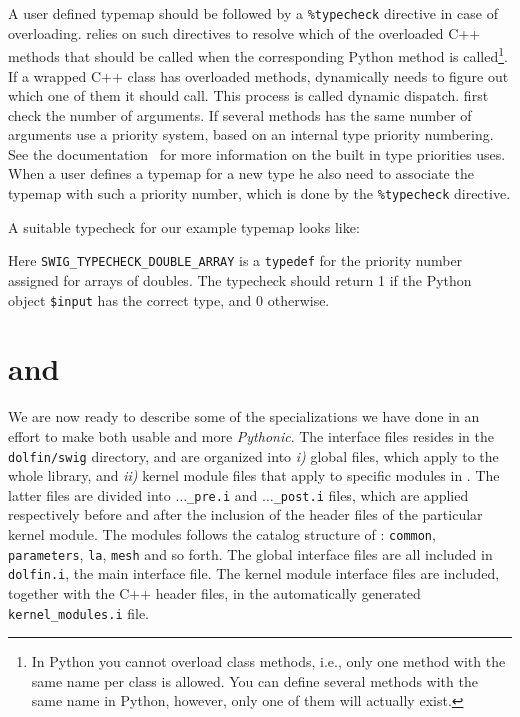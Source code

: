 A user defined typemap should be followed by a \texttt{\%typecheck} directive
in case of overloading. \swig relies on such directives to resolve which of the overloaded C++ methods that should be
called when the corresponding Python method is called\footnote{In Python you cannot overload class methods, i.e., only one method with the same name per class is allowed. You can define several methods with the same name in Python, however, only one of them will actually exist.}. If a wrapped C++ class has overloaded methods, \swig dynamically needs to figure out which one of them it should call. This process is called dynamic dispatch. \swig first check the number of arguments. If several methods has the same number of arguments \swig use a priority system, based on an internal type priority numbering. See the \swig documentation~\cite{www:swig} for more information on the built in type priorities \swig uses. When a user defines a typemap for a new type he also need to associate the typemap with such a priority number, which is done by the \texttt{\%typecheck} directive.\par
A suitable typecheck for our example typemap looks like:
Here \texttt{SWIG\_TYPECHECK\_DOUBLE\_ARRAY} is a \texttt{typedef} for the priority number assigned for arrays of doubles. The typecheck should return 1 if the Python object \texttt{\$input} has the correct type, and 0 otherwise.\par

\section{\swig and \pydolfin}
We are now ready to describe some of the specializations we have done in an effort to make \pydolfin both usable and more \textit{Pythonic}. The interface files resides in the \texttt{dolfin/swig} directory, and are organized into \textit{i)} global files, which apply to the whole \dolfin library, and \textit{ii)} kernel module files that apply to specific modules in \dolfin. The latter files are divided into \texttt{$\ldots$\_pre.i} and \texttt{$\ldots$\_post.i} files, which are applied respectively before and after the inclusion of the header files of the particular kernel module. The modules follows the catalog structure of \dolfin: \texttt{common}, \texttt{parameters}, \texttt{la}, \texttt{mesh} and so forth. The global interface files are all included in \texttt{dolfin.i}, the main \swig interface file. The kernel module interface files are included, together with the C++ header files, in the automatically generated \texttt{kernel\_modules.i} file.\par

